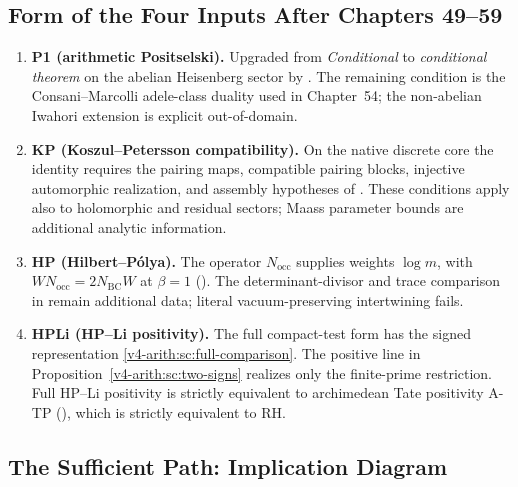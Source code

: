 \subsection{Form of the Four Inputs After Chapters 49--59}
\label{v4-arith:w5-synth:per-input}

\begin{enumerate}
\item \textbf{P1 (arithmetic Positselski).} Upgraded from
\emph{Conditional} to \emph{conditional theorem} on the abelian
Heisenberg sector by .
The remaining condition is the Consani--Marcolli adele-class
duality used in Chapter~54; the non-abelian Iwahori extension is
explicit out-of-domain.
\item \textbf{KP (Koszul--Petersson compatibility).}
On the native discrete core the identity requires the pairing maps,
compatible pairing blocks, injective automorphic realization,
and assembly hypotheses of
. These conditions apply
also to holomorphic and residual sectors; Maass parameter bounds are
additional analytic information.
\item \textbf{HP (Hilbert--P\'olya).}
The operator \(N_{\mathrm{occ}}\) supplies weights \(\log m\), with
\(WN_{\mathrm{occ}}=2N_{\mathrm{BC}}W\) at \(\beta=1\)
(). The determinant-divisor
and trace comparison in 
remain additional data; literal vacuum-preserving intertwining fails.

\item \textbf{HPLi (HP--Li positivity).} The full compact-test form
has the signed representation \eqref{v4-arith:sc:full-comparison}.
The positive line in Proposition~\ref{v4-arith:sc:two-signs} realizes only the
finite-prime restriction. Full HP--Li positivity is
strictly equivalent to archimedean Tate positivity A-TP
(), which is
strictly equivalent to RH.
\end{enumerate}

\subsection{The Sufficient Path: Implication Diagram}
\label{v4-arith:w5-synth:implication-diagram}


